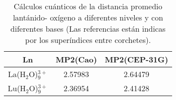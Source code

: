  \begin{center}                                                                            
 \begin{table}[h!]\label{t2}                                                               
 \caption{\footnotesize C\'alculos cu\'anticos de la distancia promedio 
 lant\'anido- ox\'igeno a diferentes niveles y con diferentes bases 
 (Las referencias est\'an indicas por los super\'indices entre corchetes).}                                                                  
 \begin{tabular}{c|cc}\hline\hline                                                          
    Ln              & MP2(Cao) &  MP2(CEP-31G)  \\ \hline
La(H$_2$O)$_9^{3+}$ & 2.57983  &  2.64479       \\
Lu(H$_2$O)$_9^{3+}$ & 2.36954  &  2.41428       \\ \hline 
\end{tabular}
\end{table}                                                           
 \end{center}                                                                              
